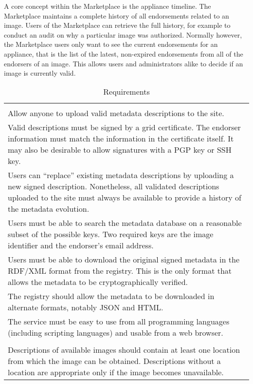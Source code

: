 A core concept within the Marketplace is the appliance timeline.  The
Marketplace maintains a complete history of all endorsements related
to an image.  Users of the Marketplace can retrieve the full history,
for example to conduct an audit on why a particular image was
authorized.  Normally however, the Marketplace users only want to see
the current endorsements for an appliance, that is the list of the
latest, non-expired endorsements from all of the endorsers of an
image.  This allows users and administrators alike to decide if an
image is currently valid.  

\begin{table}
\caption{Requirements}
\label{tab:requirements}
\begin{center}
\begin{tabular}{p{}}
\hline\hline

\\ Allow anyone to upload valid metadata descriptions to the site.

\\ Valid descriptions must be signed by a grid certificate.  The
  endorser information must match the information in the certificate
  itself.  It may also be desirable to allow signatures with a PGP key
  or SSH key.

\\ Users can ``replace'' existing metadata descriptions by
  uploading a new signed description.  Nonetheless, all validated
  descriptions uploaded to the site must always be available to
  provide a history of the metadata evolution.

\\ Users must be able to search the metadata database on a
  reasonable subset of the possible keys.  Two required keys are the
  image identifier and the endorser's email address.

\\ Users must be able to download the original signed metadata in
  the RDF/XML format from the registry.  This is the only format that
  allows the metadata to be cryptographically verified.

\\ The registry should allow the metadata to be downloaded in
  alternate formats, notably JSON and HTML.

\\ The service must be easy to use from all programming languages
  (including scripting languages) and usable from a web browser.

\\ \hline 
\\
  Descriptions of available images should contain at least one
  location from which the image can be obtained.  Descriptions without
  a location are appropriate only if the image becomes unavailable.


\end{tabular}
\end{center}
\end{table}
